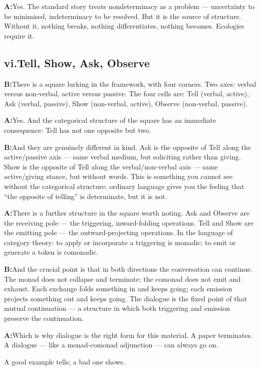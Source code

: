\documentclass[11pt]{article}
\newcommand{\A}{\medskip\noindent\textbf{A:}\quad}
\newcommand{\B}{\medskip\noindent\textbf{B:}\quad}
\begin{document}
\A Yes. The standard story treats nondeterminacy as a problem ---
uncertainty to be minimised, indeterminacy to be resolved. But it is
the source of structure. Without it, nothing breaks, nothing
differentiates, nothing becomes. Ecologies require it.

\bigskip
\subsection*{vi.\enspace Tell, Show, Ask, Observe}

\B There is a square lurking in the framework, with four corners.
Two axes: verbal versus non-verbal, active versus passive. The four
cells are: Tell (verbal, active), Ask (verbal, passive), Show
(non-verbal, active), Observe (non-verbal, passive).

\A Yes. And the categorical structure of the square has an immediate
consequence: Tell has not one opposite but two.

\B And they are genuinely different in kind. Ask is the opposite of
Tell along the active/passive axis --- same verbal medium, but
soliciting rather than giving. Show is the opposite of Tell along the
verbal/non-verbal axis --- same active/giving stance, but without
words. This is something you cannot see without the categorical
structure; ordinary language gives you the feeling that ``the
opposite of telling'' is determinate, but it is not.

\A There is a further structure in the square worth noting. Ask and
Observe are the receiving pole --- the triggering, inward-folding
operations. Tell and Show are the emitting pole --- the outward-projecting
operations. In the language of category theory: to apply or incorporate
a triggering is monadic; to emit or generate a token is comonadic.

\B And the crucial point is that in both directions the conversation
can continue. The monad does not collapse and terminate; the comonad
does not emit and exhaust. Each exchange folds something in and keeps
going; each emission projects something out and keeps going. The
dialogue is the fixed point of that mutual continuation --- a
structure in which both triggering and emission preserve the
continuation.

\A Which is why dialogue is the right form for this material. A paper
terminates. A dialogue --- like a monad-comonad adjunction --- can
always go on.

\begin{pearl}
A good example tells; a bad one shows.
\end{pearl}
\end{document}
